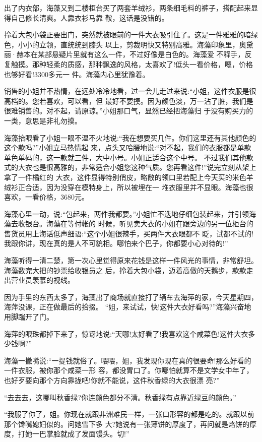\documentclass[11pt,a4paper,onecolumn]{article}
\begin{document}
出了内衣部，海藻又到二楼柜台买了两套羊绒衫，两条细毛料的裤子，搭配起来显得自己修长清爽。人靠衣衫马靠
鞍，这话是没错的。

拎着大包小袋正要出门，突然就被眼前的一件大衣吸引住了。这是一件雅雅的暗绿色，小小的立领，直统统到膝头
以上，剪裁明快又特别高雅。海藻印象里，奥黛丽·赫本在某部悬疑片里就有这么一件，不过好像是白色的。海藻爱
不释手，反复触摸。那种轻柔的质感，那种飘逸的风格，太喜欢了!低头一看价格，嗯，价格也够好看!3300多元一
件。海藻内心里犹豫着。

销售的小姐并不热情，在远处冷冷地看，过一会儿走过来说:``小姐，这件衣服是很高档的。您若喜欢，可以看，但
最好不要摸。因为颜色淡，万一沾了脏，我们是很难销售的。对不起，请原谅。''小姐那口气，显然已经把海藻归
于没有购买力的一类，意思是非礼勿摸。

海藻抬眼看了小姐一眼不温不火地说:``我在想要买几件。你们这里还有其他颜色的这个款吗?''小姐立马热情起
来，点头又哈腰地说:``对不起，我们的衣服都是单款单色单码的，这一款就三件，大中小号。小姐正适合这个中号。
不过我们其他款式的大衣也是很高雅的，非常适合小姐您这种气质。您再看这件!''说完立刻从架上拿了一件橘红的
大衣，这件显得特别俏皮，略敞的领口里若配上今天买的米色羊绒衫正合适，因为没穿在模特身上，所以被埋在一
堆衣服里并不显眼。海藻也很喜欢，一看价格，3680元。

海藻心里一动，说:``包起来，两件我都要。''小姐忙不迭地仔细包装起来，并引领海藻去收银台。海藻在等付帐的
时候，听见卖大衣的小姐在跟旁边的另一位柜台的售货员用上海话低声细语:``这个小姐很辣手，买两件大衣眼都不
眨，试都不试的!我跟你讲，现在真的是人不可貌相。哪怕来个巴子，你都要小心对待的!''

海藻听得一清二楚，第一次心里觉得原来花钱是这样一件风光的事情，非常舒坦。海藻数完大把的钞票给收银员之
后，拎着大包小袋，迈着高傲的天鹅步，款款走出营业员羡慕的视线。

因为手里的东西太多了，海藻出了商场就直接打了辆车去海萍的家，今天星期四，海萍没课，正在做最后的拾掇。
``姐，来试试，快!这件大衣好看吗?''海藻兴奋地用脚踹开了门。

海萍的眼珠都掉下来了，惊讶地说:``天哪!太好看了!我喜欢这个咸菜色!这件大衣多少钱啊?''

海藻一撇嘴说:``一提钱就俗了。喂喂，姐，我发现你现在真的很要命!那么好看的一件衣服，被你那个咸菜一形
容，都没胃口了。你哪怕就算不是文学女中年了，也好歹要向那个方向靠拢吧!你就不能说，这件秋香绿的大衣很漂
亮?''

``去去去，这哪叫秋香绿?你连颜色都分不清。秋香绿有点靠近绿豆的颜色。''

``我服了你了，姐。你现在就跟非洲难民一样，一张口形容的都是吃的。就跟以前那个馋嘴媳妇似的。问她雪下多
大?她说有一张薄饼的厚度了，再问就是烙饼的厚度，打她一巴掌脸就成了发面馒头。切!''
\end{document}

